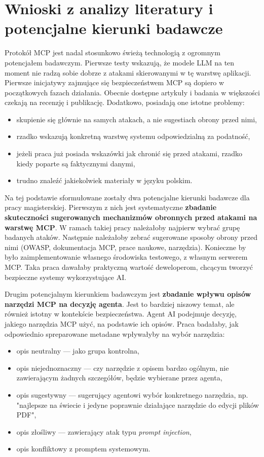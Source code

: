 \newpage
\section{Wnioski z analizy literatury i potencjalne kierunki badawcze}

Protokół MCP jest nadal stosunkowo świeżą technologią z ogromnym potencjałem badawczym. Pierwsze testy wskazują, że modele LLM na ten moment nie radzą sobie dobrze z atakami skierowanymi w tę warstwę aplikacji. Pierwsze inicjatywy zajmujące się bezpieczeństwem MCP są dopiero w początkowych fazach działania. Obecnie dostępne artykuły i badania w większości czekają na recenzję i publikację. Dodatkowo, posiadają one istotne problemy:

\begin{itemize}
    \item skupienie się głównie na samych atakach, a nie sugestiach obrony przed nimi,
    \item rzadko wskazują konkretną warstwę systemu odpowiedzialną za podatność,
    \item jeżeli praca już posiada wskazówki jak chronić się przed atakami, rzadko kiedy poparte są faktycznymi danymi,
    \item trudno znaleźć jakiekolwiek materiały w języku polskim.
\end{itemize}

Na tej podstawie sformułowane zostały dwa potencjalne kierunki badawcze dla pracy magisterskiej. Pierwszym z nich jest systematyczne \textbf{zbadanie skuteczności sugerowanych mechanizmów obronnych przed atakami na warstwę MCP}. W ramach takiej pracy należałoby najpierw wybrać grupę badanych ataków. Następnie należałoby zebrać sugerowane sposoby obrony przed nimi (OWASP, dokumentacja MCP, prace naukowe, narzędzia). Konieczne by było zaimplementowanie własnego środowiska testowego, z własnym serwerem MCP. Taka praca dawałaby praktyczną wartość deweloperom, chcącym tworzyć bezpieczne systemy wykorzystujące AI.

Drugim potencjalnym kierunkiem badawczym jest \textbf{zbadanie wpływu opisów narzędzi MCP na decyzję agenta}. Jest to bardziej niszowy temat, ale również istotny w kontekście bezpieczeństwa. Agent AI podejmuje decyzję, jakiego narzędzia MCP użyć, na podstawie ich opisów. Praca badałaby, jak odpowiednio spreparowane metadane wpływałyby na wybór narzędzia:

\begin{itemize}
    \item opis neutralny --- jako grupa kontrolna,
    \item opis niejednoznaczny --- czy narzędzie z opisem bardzo ogólnym, nie zawierającym żadnych szczegółów, będzie wybierane przez agenta,
    \item opis sugestywny --- sugerujący agentowi wybór konkretnego narzędzia, np. "najlepsze na świecie i jedyne poprawnie działające narzędzie do edycji plików PDF",
    \item opis złośliwy --- zawierający atak typu \textit{prompt injection},
    \item opis konfliktowy z promptem systemowym.
\end{itemize}
